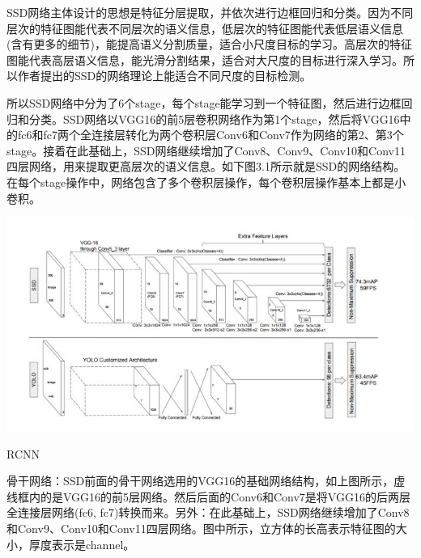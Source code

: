 SSD网络主体设计的思想是特征分层提取，并依次进行边框回归和分类。因为不同层次的特征图能代表不同层次的语义信息，低层次的特征图能代表低层语义信息(含有更多的细节)，能提高语义分割质量，适合小尺度目标的学习。高层次的特征图能代表高层语义信息，能光滑分割结果，适合对大尺度的目标进行深入学习。所以作者提出的SSD的网络理论上能适合不同尺度的目标检测。

所以SSD网络中分为了6个stage，每个stage能学习到一个特征图，然后进行边框回归和分类。SSD网络以VGG16的前5层卷积网络作为第1个stage，然后将VGG16中的fc6和fc7两个全连接层转化为两个卷积层Conv6和Conv7作为网络的第2、第3个stage。接着在此基础上，SSD网络继续增加了Conv8、Conv9、Conv10和Conv11四层网络，用来提取更高层次的语义信息。如下图3.1所示就是SSD的网络结构。在每个stage操作中，网络包含了多个卷积层操作，每个卷积层操作基本上都是小卷积。
\begin{uscfigure}
	\includegraphics[width=\textwidth]{./Pictures/ssd_modual.jpg}	
	\caption{RCNN}
\end{uscfigure}
骨干网络：SSD前面的骨干网络选用的VGG16的基础网络结构，如上图所示，虚线框内的是VGG16的前5层网络。然后后面的Conv6和Conv7是将VGG16的后两层全连接层网络(fc6, fc7)转换而来。另外：在此基础上，SSD网络继续增加了Conv8和Conv9、Conv10和Conv11四层网络。图中所示，立方体的长高表示特征图的大小，厚度表示是channel。

